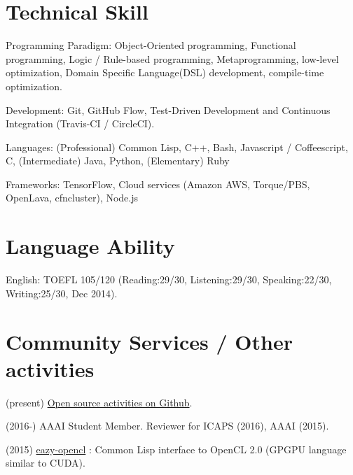 \documentclass[letterpaper,12pt]{article}
\begin{document}
\section{Technical Skill}

\begin{CV}
 \item[Programming Paradigm:] %
 Object-Oriented programming,
 Functional programming,
 Logic / Rule-based programming,
 Metaprogramming, low-level optimization,
 Domain Specific Language(DSL) development, compile-time optimization.
 \item[Development:] Git, GitHub Flow, Test-Driven Development and Continuous Integration (Travis-CI / CircleCI).
 \item[Languages:]
 (Professional) Common Lisp, C++, Bash, Javascript / Coffeescript, C,
 (Intermediate) Java, Python,
 (Elementary)   Ruby
 \item[Frameworks:] TensorFlow, Cloud services (Amazon AWS, Torque/PBS, OpenLava, cfncluster),
 Node.js%
\end{CV}

\section{Language Ability}

\begin{CV}
 \item[English:] TOEFL 105/120 (Reading:29/30, Listening:29/30,
 Speaking:22/30, Writing:25/30, Dec 2014).
\end{CV}

\section{Community Services / Other activities}

(present) \href{https://github.com/guicho271828}{Open source activities on Github}.

(2016-) AAAI Student Member. Reviewer for ICAPS (2016), AAAI (2015).

(2015) \href{https://github.com/guicho271828/eazy-opencl}{eazy-opencl}
: Common Lisp interface to OpenCL 2.0 (GPGPU language similar to CUDA).
\end{document}
